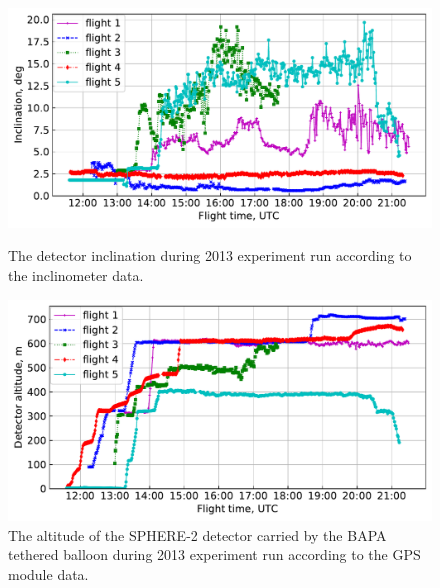 \documentclass[final,5p,times,twocolumn]{elsarticle}
\begin{document}
\begin{figure}[tb]
    \begin{minipage}[t]{0.48\textwidth}
    \centering
    \includegraphics[width=\textwidth]{figs/ClinTh.pdf}
    \caption{The detector inclination during 2013 experiment run according to the inclinometer data.}
    \label{fig:inclination} 
    \end{minipage}
    \hfill
    \begin{minipage}[t]{0.48\textwidth}
    \centering
    \includegraphics[width=\textwidth]{figs/height.pdf}
    \caption{The altitude of the SPHERE-2 detector carried by the BAPA tethered balloon during 2013 experiment run according to the GPS module data.}
    \label{fig:height}
    \end{minipage}
    
    \vspace{\baselineskip}
    

\end{figure}
\end{document}
